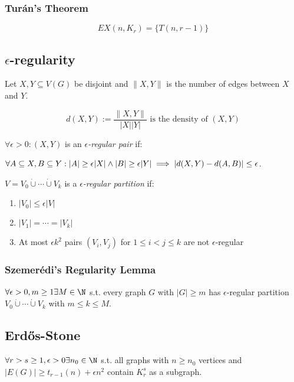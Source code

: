 \subsubsection*{Tur\'{a}n's Theorem}

$$EX(n,K_r) = \{T(n,r-1)\}$$

\subsection*{$\epsilon$-regularity}

Let $X, Y \subseteq V(G)$ be disjoint and $\|X,Y\|$ is the number of edges between $X$ and $Y$.

$$d(X,Y) := \frac{\|X,Y\|}{|X||Y|} \text{ is the density of $(X, Y)$}$$

$\forall \epsilon > 0 : (X,Y)$ is an \emph{$\epsilon$-regular pair} if:

$\forall A \subseteq X, B \subseteq Y : \\ |A| \geq \epsilon|X| \land |B| \geq \epsilon|Y| \implies |d(X,Y) - d(A,B)| \leq \epsilon$.

\spacing

$V=V_0 \dot\cup\cdots\dot\cup V_k$ is a \emph{$\epsilon$-regular partition} if:

\begin{enumerate}
	\item $|V_0| \leq \epsilon|V|$
	\item $|V_1| = \cdots = |V_k|$
	\item At most $\epsilon k^2$ pairs $(V_i,V_j)$ for $1 \leq i < j \leq k$ are not $\epsilon$-regular
\end{enumerate}

\subsubsection*{Szemer\'{e}di's Regularity Lemma}

$\forall \epsilon > 0, m \geq 1 \exists M \in \N$ s.t. every graph $G$ with $|G| \geq m$ has $\epsilon$-regular partition $V_0 \dot\cup\cdots\dot\cup V_k$ with $m \leq k \leq M$.

\subsection*{Erd\H{o}s-Stone}

$\forall r > s \geq 1, \epsilon > 0 \exists n_0 \in \N$ s.t. all graphs with $n \geq n_0$ vertices and $|E(G)| \geq t_{r-1}(n)+\epsilon n^2$ contain $K_r^s$ as a subgraph.

